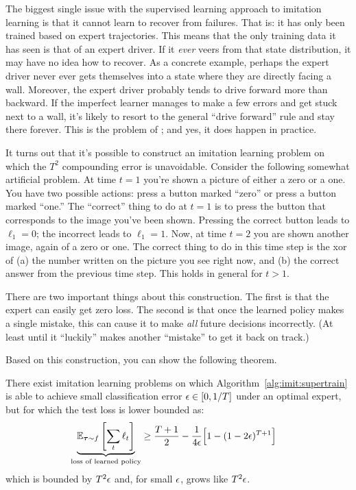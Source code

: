 The biggest single issue with the supervised learning approach to imitation learning is that it cannot learn to recover from failures.
That is: it has only been trained based on expert trajectories.
This means that the only training data it has seen is that of an expert driver.
If it \emph{ever} veers from that state distribution, it may have no idea how to recover.
As a concrete example, perhaps the expert driver never ever gets themselves into a state where they are directly facing a wall.
Moreover, the expert driver probably tends to drive forward more than backward.
If the imperfect learner manages to make a few errors and get stuck next to a wall, it's likely to resort to the general ``drive forward'' rule and stay there forever.
This is the problem of ; 
and yes, it does happen in practice.

It turns out that it's possible to construct an imitation learning problem on which the $T^2$ compounding error is unavoidable.
Consider the following somewhat artificial problem.
At time $t=1$ you're shown a picture of either a zero or a one.
You have two possible actions: press a button marked ``zero'' or press a button marked ``one.''
The ``correct'' thing to do at $t=1$ is to press the button that corresponds to the image you've been shown.
Pressing the correct button leads to $\ell_1=0$; the incorrect leads to $\ell_1=1$.
Now, at time $t=2$ you are shown another image, again of a zero or one.
The correct thing to do in this time step is the xor of (a) the number written on the picture you see right now, and (b) the correct answer from the previous time step.
This holds in general for $t>1$.

There are two important things about this construction.
The first is that the expert can easily get zero loss.
The second is that once the learned policy makes a single mistake, this can cause it to make \emph{all} future decisions incorrectly.
(At least until it ``luckily'' makes another ``mistake'' to get it back on track.)

Based on this construction, you can show the following theorem.

\begin{theorem}
  There exist imitation learning problems on which Algorithm~\ref{alg:imit:supertrain} is able to achieve small classification error $\epsilon \in [0,1/T]$ under an optimal expert, but for which the test loss is lower bounded as:
  \begin{align}
    \underbrace{\mathbb{E}_{\boldsymbol{\tau} \sim f}\left[\sum_t \ell_t\right]}_{\text{loss of learned policy}}
    & \geq
    \frac {T + 1} 2 - \frac 1 {4\epsilon} \Big[ 1 - (1-2\epsilon)^{T+1} \Big]
  \end{align}
  which is bounded by $T^2 \epsilon$ and, for small $\epsilon$, grows like $T^2 \epsilon$.
\end{theorem}

